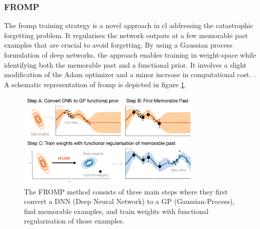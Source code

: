 \subsubsection{FROMP}
\label{sec:fromp}
The \acrshort{fromp} training strategy is a novel approach in \acrshort{cl} addressing the catastrophic forgetting problem. It regularises the network outputs at a few memorable past examples that are crucial to avoid forgetting. By using a Gaussian process formulation of deep networks, the approach enables training in weight-space while identifying both the memorable past and a functional prior. It involves a slight modification of the Adam optimizer and a minor increase in computational cost. \citep{pan2020continual}. A schematic representation of \acrshort{fromp} is depicted in figure \ref{fig:fromp}. 
\begin{figure}
    \centering
    \includegraphics[width=0.8\textwidth]{Images//fromp.png}
    \caption{The FROMP method consists of three main steps where they first convert a DNN (Deep Neural Network) to a GP (Gaussian-Process), find memorable examples, and train weights with functional regularisation of those examples. \citep{pan2020continual}}
    \label{fig:fromp}
\end{figure}


